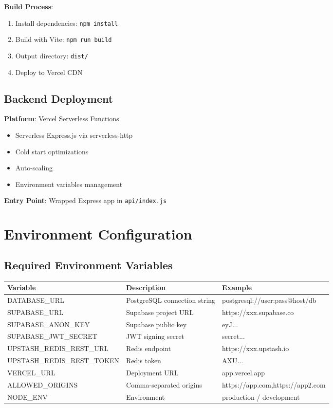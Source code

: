 \documentclass[12pt,a4paper]{report}
\begin{document}
\textbf{Build Process}:
\begin{enumerate}
    \item Install dependencies: \texttt{npm install}
    \item Build with Vite: \texttt{npm run build}
    \item Output directory: \texttt{dist/}
    \item Deploy to Vercel CDN
\end{enumerate}

\subsection{Backend Deployment}

\textbf{Platform}: Vercel Serverless Functions
\begin{itemize}
    \item Serverless Express.js via serverless-http
    \item Cold start optimizations
    \item Auto-scaling
    \item Environment variables management
\end{itemize}

\textbf{Entry Point}: Wrapped Express app in \texttt{api/index.js}

\section{Environment Configuration}

\subsection{Required Environment Variables}

\begin{longtable}{|p{2.5cm}|p{3cm}|p{3cm}|}
\hline
\textbf{Variable} & \textbf{Description} & \textbf{Example} \\
\hline
DATABASE\_URL & PostgreSQL connection string & postgresql://user:pass@host/db \\
\hline
SUPABASE\_URL & Supabase project URL & https://xxx.supabase.co \\
\hline
SUPABASE\_ANON\_KEY & Supabase public key & eyJ... \\
\hline
SUPABASE\_JWT\_SECRET & JWT signing secret & secret... \\
\hline
UPSTASH\_REDIS\_REST\_URL & Redis endpoint & https://xxx.upstash.io \\
\hline
UPSTASH\_REDIS\_REST\_TOKEN & Redis token & AXU... \\
\hline
VERCEL\_URL & Deployment URL & app.vercel.app \\
\hline
ALLOWED\_ORIGINS & Comma-separated origins & https://app.com,https://app2.com \\
\hline
NODE\_ENV & Environment & production / development \\
\hline
\end{longtable}
\end{document}
